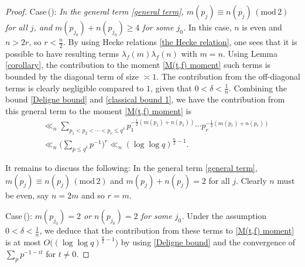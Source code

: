 \documentclass[11pt,reqno]{amsart}
\numberwithin{equation}{section}
\theoremstyle{plain}
\theoremstyle{definition}
\renewcommand{\bmod}[1]{\,(\mathrm{mod\,}{#1})}
\begin{document}
\begin{proof}
Case\,(\uppercase\expandafter{}):
\emph{In the general term \eqref{general term}, $m(p_{j})\equiv n(p_{j})\bmod2$ for all $j$,
and $m(p_{j_0})+n(p_{j_0})\geq4$ for some $j_0$.}
In this case, $n$ is even and $n>2r$, so $r<\frac{n}{2}$.
By using Hecke relations \eqref{the Hecke relation},
one sees that it is possible to have resulting terms $\lambda_f(m)\lambda_f(n)$ with $m=n$.
Using Lemma \ref{corollary}, the contribution to the moment \eqref{M(t,f) moment} such terms is bounded by
the diagonal term of size $\asymp 1$. The contribution from the off-diagonal terms is clearly negligible compared
to $1$, given that $0<\delta<\frac{1}{n}$.
Combining the bound \eqref{Deligne bound} and \eqref{classical bound 1},
we have the contribution from this general term to the moment \eqref{M(t,f) moment} is
\begin{equation*}
\begin{split}
&\ll_n\sum_{p_1<p_2<\cdots<p_r\leq q^\delta}p_1^{-\frac{1}{2}(m(p_1)+n(p_1))}\cdots
p_r^{-\frac{1}{2}(m(p_r)+n(p_r))}\\
&\ll_n\bigg(\sum_{p\leq q^\delta}p^{-1}\bigg)^r
\ll_n (\log\log q)^{\frac{n}{2}-1}.
\end{split}
\end{equation*}

It remains to discuss the following: In the general term \eqref{general term}, $m(p_{j})\equiv n(p_{j})\bmod2$
and $m(p_j)+n(p_j)=2$ for all $j$. Clearly $n$ must be even, say $n=2m$ and so $r=m$.

Case\,(\uppercase\expandafter{}):
\emph{$m(p_{j_0})=2$ or $n(p_{j_0})=2$ for some $j_0$.}
Under the assumption $0<\delta<\frac{1}{n}$, we deduce that the contribution from these terms to \eqref{M(t,f) moment} is
at most $O\big((\log\log q)^{\frac{n}{2}-1}\big)$ by using \eqref{Deligne bound}
and the convergence of $\sum_{p}p^{-1-it}$ for $t\neq 0$.


\end{proof}
\end{document}
